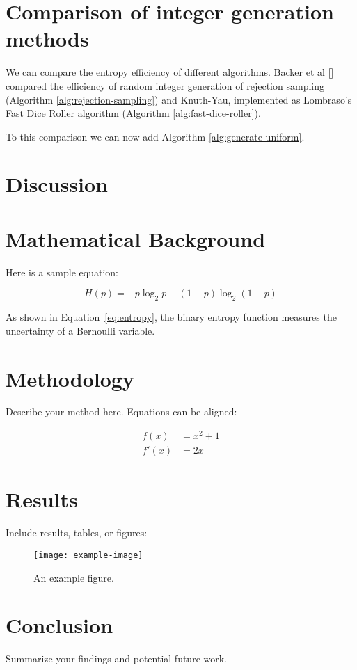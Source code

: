 \documentclass[12pt]{article}
\begin{document}
\section {Comparison of integer generation methods}

We can compare the entropy efficiency of different algorithms. Backer et al [] compared the efficiency of random integer generation of rejection sampling (Algorithm \ref{alg:rejection-sampling}) and Knuth-Yau, implemented as Lombraso's Fast Dice Roller algorithm (Algorithm \ref{alg:fast-dice-roller}).

To this comparison we can now add Algorithm \ref{alg:generate-uniform}.


\section{Discussion}


\section{Mathematical Background}

Here is a sample equation:

\begin{equation}
H(p) = -p \log_2 p - (1 - p) \log_2(1 - p)
\label{eq:entropy}
\end{equation}

As shown in Equation~\ref{eq:entropy}, the binary entropy function measures the uncertainty of a Bernoulli variable.

\section{Methodology}

Describe your method here. Equations can be aligned:

\begin{align}
f(x) &= x^2 + 1 \\
f'(x) &= 2x
\end{align}

\section{Results}

Include results, tables, or figures:

\begin{figure}[ht]
\centering
\texttt{[image: example-image]}
\caption{An example figure.}
\label{fig:example}
\end{figure}

\section{Conclusion}

Summarize your findings and potential future work.

\printbibliography
\end{document}
